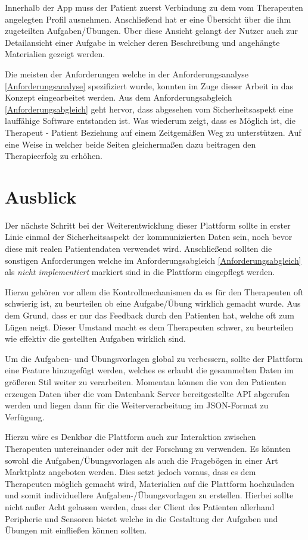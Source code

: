 Innerhalb der App muss der Patient zuerst Verbindung zu dem vom Therapeuten angelegten Profil ausnehmen. Anschließend hat er eine Übersicht über die ihm zugeteilten Aufgaben/Übungen. Über diese Ansicht gelangt der Nutzer auch zur Detailansicht einer Aufgabe in welcher deren Beschreibung und angehängte Materialien gezeigt werden.

Die meisten der Anforderungen welche in der Anforderungsanalyse \ref{Anforderungsanalyse} spezifiziert wurde, konnten im Zuge dieser Arbeit in das Konzept eingearbeitet werden. Aus dem Anforderungsabgleich \ref{Anforderungsabgleich} geht hervor, dass abgesehen vom Sicherheitsaspekt eine lauffähige Software entstanden ist. Was wiederum zeigt, dass es Möglich ist, die Therapeut - Patient Beziehung auf einem Zeitgemäßen Weg zu unterstützen. Auf eine Weise in welcher beide Seiten gleichermaßen dazu beitragen den Therapieerfolg zu erhöhen.  

\section{Ausblick}
Der nächste Schritt bei der Weiterentwicklung dieser Plattform sollte in erster Linie einmal der Sicherheitsaspekt der kommunizierten Daten sein, noch bevor diese mit realen Patientendaten verwendet wird. Anschließend sollten die sonstigen Anforderungen welche im Anforderungsabgleich \ref{Anforderungsabgleich} als \textit{nicht implementiert} markiert sind in die Plattform eingepflegt werden.

Hierzu gehören vor allem die Kontrollmechanismen da es für den Therapeuten oft schwierig ist, zu beurteilen ob eine Aufgabe/Übung wirklich gemacht wurde. Aus dem Grund, dass er nur das Feedback durch den Patienten hat, welche oft zum Lügen neigt. Dieser Umstand macht es dem Therapeuten schwer, zu beurteilen wie effektiv die gestellten Aufgaben wirklich sind. 

Um die Aufgaben- und Übungsvorlagen global zu verbessern, sollte der Plattform eine Feature hinzugefügt werden, welches es erlaubt die gesammelten Daten im größeren Stil weiter zu verarbeiten. Momentan können die von den Patienten erzeugen Daten über die vom Datenbank Server bereitgestellte API abgerufen werden und liegen dann für die Weiterverarbeitung im JSON-Format zu Verfügung.

Hierzu wäre es Denkbar die Plattform auch zur Interaktion zwischen Therapeuten untereinander oder mit der Forschung zu verwenden. Es könnten sowohl die Aufgaben/Übungsvorlagen als auch die Fragebögen in einer Art Marktplatz angeboten werden. Dies setzt jedoch voraus, dass es dem Therapeuten möglich gemacht wird, Materialien auf die Plattform hochzuladen und somit individuellere Aufgaben-/Übungsvorlagen zu erstellen. Hierbei sollte nicht außer Acht gelassen werden, dass der Client des Patienten allerhand Peripherie und Sensoren bietet welche in die Gestaltung der Aufgaben und Übungen mit einfließen können sollten.  

